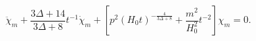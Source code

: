 \begin{equation}
\ddot{\chi}_{m} + \frac{3 \Delta+14}{3 \Delta+8} t^{-1} \dot{\chi}_{m}
+ \left[ p^{2} \left( H_{0} t \right)^{- \frac{4}{3 \Delta+8}} 
+ \frac{m^{2}}{H_{0}^{2}} t^{-2} \right] \chi_{m} = 0.
\end{equation}

